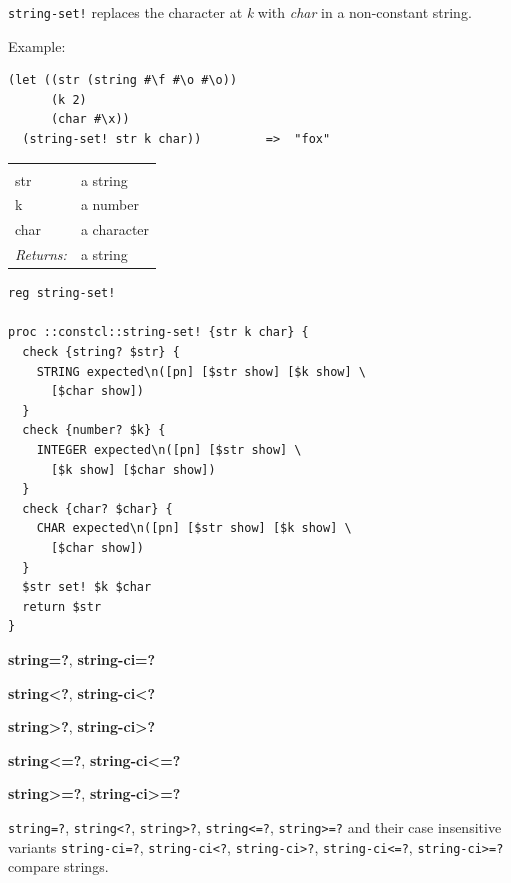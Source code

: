 \documentclass[twoside,9pt]{report}
\begin{document}
\texttt{string-set!} replaces the character at \emph{k} with \emph{char} in a non-constant string.



Example:

\begin{verbatim}
(let ((str (string #\f #\o #\o))
      (k 2)
      (char #\x))
  (string-set! str k char))         =>  "fox"
\end{verbatim}
\noindent\begin{tabular}{ |p{1.5cm} p{8cm}| }
\hline
\rowcolor[HTML]{CCCCCC} \multicolumn{2}{|l|}{\bf string-set! (public)} \\
str & a string \\
k & a number \\
char & a character \\
\textit{Returns:} & a string \\
\hline
\end{tabular}
\begin{lstlisting}
reg string-set!
 
proc ::constcl::string-set! {str k char} {
  check {string? $str} {
    STRING expected\n([pn] [$str show] [$k show] \
      [$char show])
  }
  check {number? $k} {
    INTEGER expected\n([pn] [$str show] \
      [$k show] [$char show])
  }
  check {char? $char} {
    CHAR expected\n([pn] [$str show] [$k show] \
      [$char show])
  }
  $str set! $k $char
  return $str
}
\end{lstlisting}


\textbf{string=?}, \textbf{string-ci=?}


\textbf{string<?}, \textbf{string-ci<?}


\textbf{string>?}, \textbf{string-ci>?}


\textbf{string<=?}, \textbf{string-ci<=?}


\textbf{string>=?}, \textbf{string-ci>=?}


\texttt{string=?}, \texttt{string<?}, \texttt{string>?}, \texttt{string<=?}, \texttt{string>=?} and their case insensitive variants \texttt{string-ci=?}, \texttt{string-ci<?}, \texttt{string-ci>?}, \texttt{string-ci<=?}, \texttt{string-ci>=?} compare strings.
\end{document}
